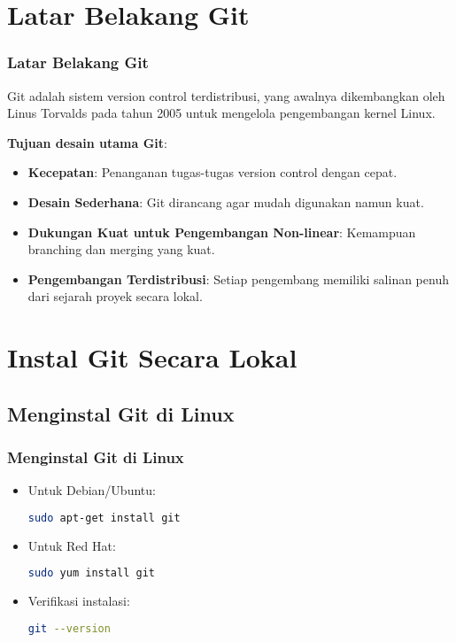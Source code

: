 \documentclass[aspectratio=169, table]{beamer}
\begin{document}
\section{Latar Belakang Git}

\begin{frame}[fragile]
\vspace{10pt}
\frametitle{Latar Belakang Git}
Git adalah sistem version control terdistribusi, yang awalnya dikembangkan oleh Linus Torvalds pada tahun 2005 untuk mengelola pengembangan kernel Linux. 

\textbf{Tujuan desain utama Git}:
\begin{itemize}
\item \textbf{Kecepatan}: Penanganan tugas-tugas version control dengan cepat.
\item \textbf{Desain Sederhana}: Git dirancang agar mudah digunakan namun kuat.
\item \textbf{Dukungan Kuat untuk Pengembangan Non-linear}: Kemampuan branching dan merging yang kuat.
\item \textbf{Pengembangan Terdistribusi}: Setiap pengembang memiliki salinan penuh dari sejarah proyek secara lokal.
\end{itemize}
\end{frame}

\section{Instal Git Secara Lokal}


\subsection{Menginstal Git di Linux}

\begin{frame}[fragile]
\frametitle{Menginstal Git di Linux}
\begin{itemize}
\item Untuk Debian/Ubuntu:
\begin{lstlisting}[language=bash]
	sudo apt-get install git
\end{lstlisting}
\item Untuk Red Hat:
\begin{lstlisting}[language=bash]
	sudo yum install git
\end{lstlisting}
\item Verifikasi instalasi:
\begin{lstlisting}[language=bash]
	git --version
\end{lstlisting}
\end{itemize}
\end{frame}
\end{document}
